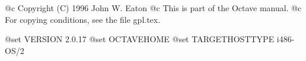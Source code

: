 @c Copyright (C) 1996 John W. Eaton
@c This is part of the Octave manual.
@c For copying conditions, see the file gpl.tex.

@set VERSION 2.0.17
@set OCTAVEHOME 
@set TARGETHOSTTYPE i486-OS/2
